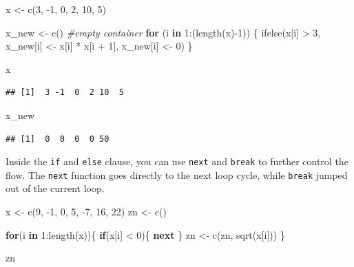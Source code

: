 \documentclass[
]{book}
\newenvironment{Shaded}{\begin{snugshade}}{\end{snugshade}}
\newcommand{\CommentTok}[1]{\textcolor[rgb]{0.56,0.35,0.01}{\textit{#1}}}
\newcommand{\ControlFlowTok}[1]{\textcolor[rgb]{0.13,0.29,0.53}{\textbf{#1}}}
\newcommand{\DecValTok}[1]{\textcolor[rgb]{0.00,0.00,0.81}{#1}}
\newcommand{\FunctionTok}[1]{\textcolor[rgb]{0.00,0.00,0.00}{#1}}
\newcommand{\NormalTok}[1]{#1}
\newcommand{\OtherTok}[1]{\textcolor[rgb]{0.56,0.35,0.01}{#1}}
\newcommand{\SpecialCharTok}[1]{\textcolor[rgb]{0.00,0.00,0.00}{#1}}
\begin{document}
\begin{Shaded}
\begin{Highlighting}[]
\NormalTok{x }\OtherTok{\textless{}{-}} \FunctionTok{c}\NormalTok{(}\DecValTok{3}\NormalTok{, }\SpecialCharTok{{-}}\DecValTok{1}\NormalTok{, }\DecValTok{0}\NormalTok{, }\DecValTok{2}\NormalTok{, }\DecValTok{10}\NormalTok{, }\DecValTok{5}\NormalTok{)}

\NormalTok{x\_new }\OtherTok{\textless{}{-}} \FunctionTok{c}\NormalTok{() }\CommentTok{\#empty container}
\ControlFlowTok{for}\NormalTok{ (i }\ControlFlowTok{in} \DecValTok{1}\SpecialCharTok{:}\NormalTok{(}\FunctionTok{length}\NormalTok{(x)}\SpecialCharTok{{-}}\DecValTok{1}\NormalTok{)) \{}
  \FunctionTok{ifelse}\NormalTok{(x[i] }\SpecialCharTok{\textgreater{}} \DecValTok{3}\NormalTok{,  x\_new[i] }\OtherTok{\textless{}{-}}\NormalTok{ x[i] }\SpecialCharTok{*}\NormalTok{ x[i }\SpecialCharTok{+} \DecValTok{1}\NormalTok{], x\_new[i] }\OtherTok{\textless{}{-}} \DecValTok{0}\NormalTok{)  }
\NormalTok{\}}

\NormalTok{x}
\end{Highlighting}
\end{Shaded}

\begin{verbatim}
## [1]  3 -1  0  2 10  5
\end{verbatim}

\begin{Shaded}
\begin{Highlighting}[]
\NormalTok{x\_new}
\end{Highlighting}
\end{Shaded}

\begin{verbatim}
## [1]  0  0  0  0 50
\end{verbatim}

Inside the \texttt{if} and \texttt{else} clause, you can use \texttt{next} and \texttt{break} to further control the flow. The \texttt{next} function goes directly to the next loop cycle, while \texttt{break} jumped out of the current loop.

\begin{Shaded}
\begin{Highlighting}[]
\NormalTok{x }\OtherTok{\textless{}{-}} \FunctionTok{c}\NormalTok{(}\DecValTok{9}\NormalTok{, }\SpecialCharTok{{-}}\DecValTok{1}\NormalTok{, }\DecValTok{0}\NormalTok{, }\DecValTok{5}\NormalTok{, }\SpecialCharTok{{-}}\DecValTok{7}\NormalTok{, }\DecValTok{16}\NormalTok{, }\DecValTok{22}\NormalTok{)}
\NormalTok{zn }\OtherTok{\textless{}{-}} \FunctionTok{c}\NormalTok{()}

\ControlFlowTok{for}\NormalTok{(i }\ControlFlowTok{in} \DecValTok{1}\SpecialCharTok{:}\FunctionTok{length}\NormalTok{(x))\{ }
  \ControlFlowTok{if}\NormalTok{(x[i] }\SpecialCharTok{\textless{}} \DecValTok{0}\NormalTok{)\{ }
    \ControlFlowTok{next}
\NormalTok{  \} }
\NormalTok{  zn }\OtherTok{\textless{}{-}} \FunctionTok{c}\NormalTok{(zn,  }\FunctionTok{sqrt}\NormalTok{(x[i]))}
\NormalTok{\}}

\NormalTok{zn}
\end{Highlighting}
\end{Shaded}
\end{document}
